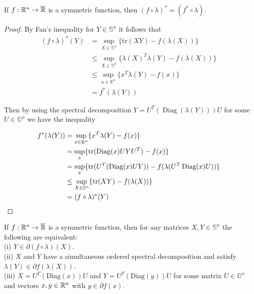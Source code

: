 \begin{theorem}
If $f: \Bbb R^n \rightarrow \overline{\Bbb R}$ is a symmetric function, then $(f \circ \lambda)^* = (f^* \circ \lambda)$.
\end{theorem}

\begin{proof}
By Fan's inequality for $Y \in \mathbb{S}^n$ it follows that
\begin{align*}
(f \circ \lambda)^*(Y) &= \underset{X \in \mathbb{S}^n}{\operatorname{sup}} \{\mathrm{tr}(XY) - f(\lambda(X))\} \\
&\leq \underset{X \in \mathbb{S}^n}{\operatorname{sup}} \{\lambda(X)^T\lambda(Y) - f(\lambda(X))\} \\
&\leq \underset{x \in \mathbb{R}^n}{\operatorname{sup}} \{ x^T \lambda(Y) - f(x) \} \\
&= f^*(\lambda(Y))
\end{align*}

Then by using the spectral decomposition $Y = U^T(\operatorname{Diag}(\lambda(Y)))U$ for some $U \in \mathbb{O}^n$ we have the inequality

\begin{align*}
f^*(\lambda(Y)) &= \underset{x \in \Bbb R^n}{\operatorname{sup}} \{x^T \lambda(Y) - f(x) \} \\
&= \underset{x}{\operatorname{sup}} \{\operatorname{tr}(\operatorname{Diag}(x)UYU^T) - f(x) \} \\
&= \underset{x}{\operatorname{sup}} \{\operatorname{tr}(U^T(\operatorname{Diag}(x)UY)) - f(\lambda(U^T \operatorname{Diag}(x)U)) \} \\
&\leq \underset{X \in \mathbb{S}^n}{\operatorname{sup}} \{ \operatorname{tr}(XY) - f(\lambda(X)) \} \\
&= (f \circ \lambda)^*(Y)
\end{align*}

\end{proof}

\begin{theorem}
If $f: \Bbb R^n \rightarrow \overline{\Bbb R}$ is a symmetric function, then for any matrices $X, Y \in \mathbb{S}^n$ the following are equivalent:
\\
(i) $Y \in \partial(f \circ \lambda)(X)$.
\\
(ii) $X$ and $Y$ have a simultaneous ordered spectral decomposition and satisfy $\lambda(Y) \in \partial f(\lambda(X))$.
\\
(iii) $X = U^T(\mathrm{Diag}(x))U$ and $Y = U^T(\mathrm{Diag}(y))U$ for some matrix $U \in \mathbb{O}^n$ and vectors $x, y \in \Bbb R^n$ with $y \in \partial f(x)$.
\end{theorem}


